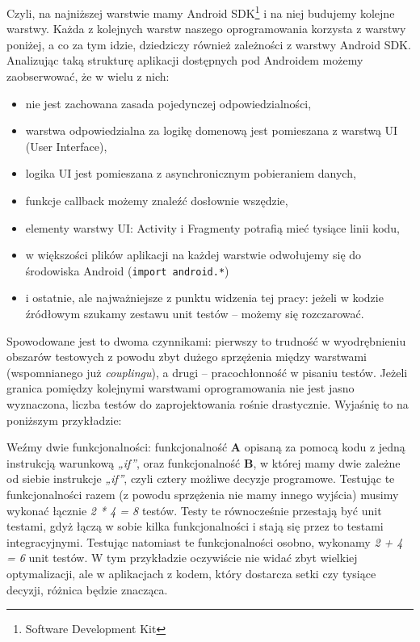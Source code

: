 Czyli, na najniższej warstwie mamy Android SDK\footnote{Software Development Kit}  i na niej budujemy kolejne warstwy. Każda z kolejnych warstw naszego oprogramowania korzysta z warstwy poniżej, a co za tym idzie, dziedziczy również zależności z warstwy Android SDK. Analizując taką strukturę aplikacji dostępnych pod Androidem możemy zaobserwować, że w wielu z nich:
\begin{itemize}
\item
nie jest zachowana zasada pojedynczej odpowiedzialności,
\item
warstwa odpowiedzialna za logikę domenową jest pomieszana z warstwą UI (User Interface),
\item
logika UI jest pomieszana z asynchronicznym pobieraniem danych,
\item
funkcje callback możemy znaleźć dosłownie wszędzie,
\item
elementy warstwy UI: Activity i Fragmenty potrafią mieć tysiące linii kodu,
\item
w większości plików aplikacji na każdej warstwie odwołujemy się do środowiska Android (\texttt{import android.*})
\item
i ostatnie, ale najważniejsze z punktu widzenia tej pracy: jeżeli w kodzie źródłowym szukamy zestawu unit testów – możemy się rozczarować.
\end{itemize}

Spowodowane jest to dwoma czynnikami: pierwszy to trudność w wyodrębnieniu obszarów testowych z powodu zbyt dużego sprzężenia między warstwami (wspomnianego już \textit{couplingu}), a drugi – pracochłonność w pisaniu testów. Jeżeli granica pomiędzy kolejnymi warstwami oprogramowania nie jest jasno wyznaczona, liczba testów do zaprojektowania rośnie drastycznie. Wyjaśnię to na poniższym przykładzie:

Weźmy dwie funkcjonalności: funkcjonalność \textbf{A} opisaną za pomocą kodu z jedną instrukcją warunkową \textit{„if”}, oraz funkcjonalność \textbf{B}, w której mamy dwie zależne od siebie instrukcje \textit{„if”}, czyli cztery możliwe decyzje programowe. Testując te funkcjonalności razem (z powodu sprzężenia nie mamy innego wyjścia) musimy wykonać łącznie \textit{2 * 4 = 8} testów. Testy te równocześnie przestają być unit testami, gdyż łączą w sobie kilka funkcjonalności i stają się przez to testami integracyjnymi. Testując natomiast te funkcjonalności osobno, wykonamy \textit{2 + 4 = 6} unit testów. W tym przykładzie oczywiście nie widać zbyt wielkiej optymalizacji, ale w aplikacjach z kodem, który dostarcza setki czy tysiące decyzji, różnica będzie znacząca.

